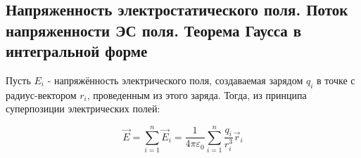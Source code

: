\subsection{Напряженность электростатического поля. Поток напряженности ЭС поля. Теорема Гаусса в интегральной форме}

\begin{definition}
    Пусть $E_i$ - напряжённость электрического поля, создаваемая зарядом $q_i$ в точке с радиус-вектором
    $r_i$, проведенным из этого заряда. Тогда, из принципа суперпозиции электрических полей:

    $$
    \vec E=\sum_{i=1}^n\vec E_i=\frac{1}{4\pi\varepsilon_0}\sum_{i=1}^{n}\frac{q_i}{r^3_i}\vec r_i$$
\end{definition}